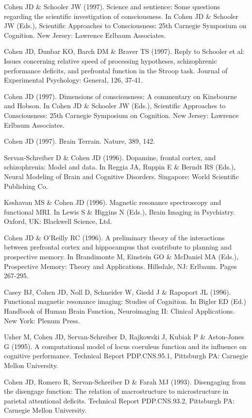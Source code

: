 \documentclass[10 pt]{article}
\begin{document}
Cohen JD \& Schooler JW (1997). Science and sentience: Some questions regarding the scientific investigation of consciousness. In Cohen JD \& Schooler JW (Eds.), Scientific Approaches to Consciousness: 25th Carnegie Symposium on Cognition. New Jersey: Lawrence Erlbaum Associates.

Cohen JD, Dunbar KO, Barch DM \& Braver TS (1997). Reply to Schooler et al: Issues concerning relative speed of processing hypotheses, schizophrenic performance deficits, and prefrontal function in the Stroop task. Journal of Experimental Psychology: General, 126, 37-41.

Cohen JD (1997). Dimensions of consciousness: A commentary on Kinsbourne and Hobson. In Cohen JD \& Schooler JW (Eds.), Scientific Approaches to Consciousness: 25th Carnegie Symposium on Cognition. New Jersey: Lawrence Erlbaum Associates.

Cohen JD (1997). Brain Terrain. Nature, 389, 142.

Servan-Schreiber D \& Cohen JD (1996). Dopamine, frontal cortex, and schizophrenia: Model and data. In Reggia JA, Ruppin E \& Berndt RS (Eds.), Neural Modeling of Brain and Cognitive Disorders. Singapore: World Scientific Publishing Co.

Keshavan MS \& Cohen JD (1996). Magnetic resonance spectroscopy and functional MRI. In Lewis S \& Higgins N (Eds.), Brain Imaging in Psychiatry. Oxford, UK: Blackwell Science, Ltd.

Cohen JD \& O’Reilly RC (1996). A preliminary theory of the interactions between prefrontal cortex and hippocampus that contribute to planning and prospective memory. In Brandimonte M, Einstein GO \& McDaniel MA (Eds.), Prospective Memory: Theory and Applications. Hillsdale, NJ: Erlbaum. Pages 267-295.

Casey BJ, Cohen JD, Noll D, Schneider W, Giedd J \& Rapoport JL (1996). Functional magnetic resonance imaging: Studies of Cognition. In Bigler ED (Ed.) Handbook of Human Brain Function, Neuroimaging II: Clinical Applications. New York: Plenum Press.

Usher M, Cohen JD, Servan-Schreiber D, Rajkowski J, Kubiak P \& Aston-Jones G (1995). A computational model of locus coeruleus function and its influence on cognitive performance. Technical Report PDP.CNS.95.1, Pittsburgh PA: Carnegie Mellon University.

Cohen JD, Romero R, Servan-Schreiber D \& Farah MJ (1993). Disengaging from the disengage function: The relation of macrostructure to microstructure in parietal attentional deficits. Technical Report PDP.CNS.93.2, Pittsburgh PA: Carnegie Mellon University.
\end{document}
